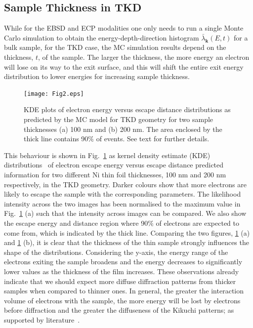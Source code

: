 %
\subsection{Sample Thickness in TKD}
\label{sec:TKDthickness}
While for the EBSD and ECP modalities one only needs to run a single Monte Carlo simulation to obtain the energy-depth-direction histogram $\bar{\lambda}_{\mathbf{k}}(E,t)$ for a bulk sample, for the TKD case, the MC simulation results depend on the thickness, $t$, of the sample.
The larger the thickness, the more energy an electron will lose on its way to the exit surface, and this will shift the entire exit energy distribution to lower energies for increasing sample thickness. 


\begin{figure}[ht]
\centering
\texttt{[image: Fig2.eps]}%
\caption[KDE plots of electron energy versus escape distance distributions]{KDE plots of electron energy versus escape distance distributions as predicted by the MC model for TKD geometry for two sample thicknesses (a) 100 nm and (b) 200 nm. The area enclosed by the thick line contains 90$\%$ of events. See text for further details. }
\label{fig:E_z_KDE}
\end{figure}

This behaviour is shown in Fig.~\ref{fig:E_z_KDE} as kernel density estimate (KDE) distributions~\cite{KDE} of electron escape energy versus escape distance predicted information for two different Ni thin foil thicknesses, 100 nm and 200 nm respectively, in the TKD geometry. Darker colours show that more electrons are likely to escape the sample with the corresponding parameters. The likelihood intensity across the two images has been normalised to the maximum value in Fig.~\ref{fig:E_z_KDE} (a) such that the intensity across images can be compared. We also show the escape energy and distance region where 90$\%$ of electrons are expected to come from, which is indicated by the thick line. Comparing the two figures, \ref{fig:E_z_KDE} (a) and \ref{fig:E_z_KDE} (b), it is clear that the thickness of the thin sample strongly influences the shape of the distributions. Considering the y-axis, the energy range of the electrons exiting the sample broadens and the energy decreases to significantly lower values as the thickness of the film increases. These observations already indicate that we should expect more diffuse diffraction patterns from thicker samples when compared to thinner ones. In general, the greater the interaction volume of electrons with the sample, the more energy will be lost by electrons before diffraction and the greater the diffuseness of the Kikuchi patterns; as supported by literature~\cite{rice2014}. 

